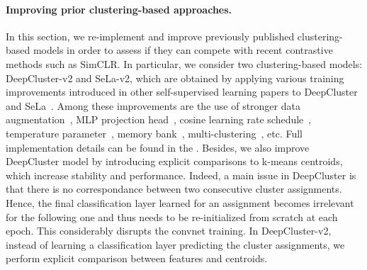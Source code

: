 \paragraph{Improving prior clustering-based approaches.}
In this section, we re-implement and improve previously published clustering-based models in order to assess if they can compete with recent contrastive methods such as SimCLR.
In particular, we consider two clustering-based models: DeepCluster-v2 and SeLa-v2, which are obtained by applying various training improvements introduced in other self-supervised learning papers to DeepCluster~\cite{caron2018deep} and SeLa~\cite{asano2019self}.
Among these improvements are the use of stronger data augmentation~\cite{chen2020simple}, MLP projection head~\cite{chen2020simple}, cosine learning rate schedule~\cite{misra2019self}, temperature parameter~\cite{wu2018unsupervised}, memory bank~\cite{wu2018unsupervised}, multi-clustering~\cite{asano2019self}, etc.
Full implementation details can be found in the \appendixName.
Besides, we also improve DeepCluster model by introducing explicit comparisons to k-means centroids, which increase stability and performance.
Indeed, a main issue in DeepCluster is that there is no correspondance between two consecutive cluster assignments.
Hence, the final classification layer learned for an assignment becomes irrelevant for the following one and thus needs to be re-initialized from scratch at each epoch.
This considerably disrupts the convnet training.
In DeepCluster-v2, instead of learning a classification layer predicting the cluster assignments, we perform explicit comparison between features and centroids.

